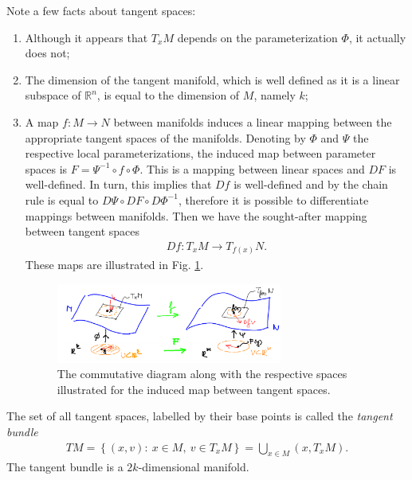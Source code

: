 \begin{remark}[]
	Note a few facts about tangent spaces:
	\begin{enumerate}
		\item Although it appears that $T_{x}M$ depends on the parameterization $\Phi$, it actually does not;
		\item The dimension of the tangent manifold, which is well defined as it is a linear subspace of $\mathbb{R}^{n}$, is equal to the dimension of $M$, namely $k$;
		\item A map $f:M\to N$ between manifolds induces a linear mapping between the appropriate tangent spaces of the manifolds. Denoting by $\Phi$ and $\Psi$ the respective local parameterizations, the induced map between parameter spaces is $F= \Psi^{-1} \circ f \circ \Phi$. This is a mapping between linear spaces and $DF$ is well-defined. In turn, this implies that $Df$ is well-defined and by the chain rule is equal to $D\Psi \circ DF \circ D\Phi^{-1}$, therefore it is possible to differentiate mappings between manifolds. Then we have the sought-after mapping between tangent spaces 
			\begin{align}
				Df: T_{x}M \to T_{f(x)}N.
			\end{align}
			These maps are illustrated in Fig. \ref{fig:induced_tangent_map}.
			\begin{figure}[h!]
				\centering
				\includegraphics[width=0.7\textwidth]{figures/ch9/7induced_tangent_map.png}
				\caption{The commutative diagram along with the respective spaces illustrated for the induced map between tangent spaces.}
				\label{fig:induced_tangent_map}
			\end{figure}
	\end{enumerate}
\end{remark}

\begin{definition}
	The set of all tangent spaces, labelled by their base points is called the \emph{tangent bundle}
	\begin{align}
		\boxed{
			TM = \left\{ (x,v):\ x\in M,\ v\in T_{x}M \right\} = \bigcup_{x\in M}(x, T_{x}M).
		}
	\end{align}
The tangent bundle is a $2k$-dimensional manifold.	
\end{definition}

